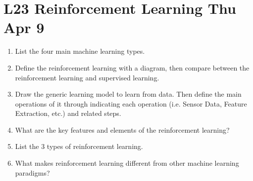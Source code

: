 \documentclass[12pt]{article}
\newenvironment{QandA}{\begin{enumerate}[label=\bfseries\arabic*.]\bfseries}
{\end{enumerate}}
\newenvironment{answered}{\par\normalfont\color{Sepia}}{}
\begin{document}
\section*{L23 Reinforcement Learning \textemdash{} Thu Apr 9}
\begin{QandA}
    \item List the four main machine learning types.
    \begin{answered}
    \end{answered}

    \item Define the reinforcement learning with a diagram, then compare between the
          reinforcement learning and supervised learning.
    \begin{answered}
    \end{answered}

    \item Draw the generic learning model to learn from data. Then define the main operations of
          it through indicating each operation (i.e. Sensor Data, Feature Extraction, etc.) and
          related steps.
    \begin{answered}
    \end{answered}

    \item What are the key features and elements of the reinforcement learning?
    \begin{answered}
    \end{answered}

    \item List the 3 types of reinforcement learning.
    \begin{answered}
    \end{answered}

    \item What makes reinforcement learning different from other machine learning paradigms?
    \begin{answered}
    \end{answered}

\end{QandA}
\end{document}
